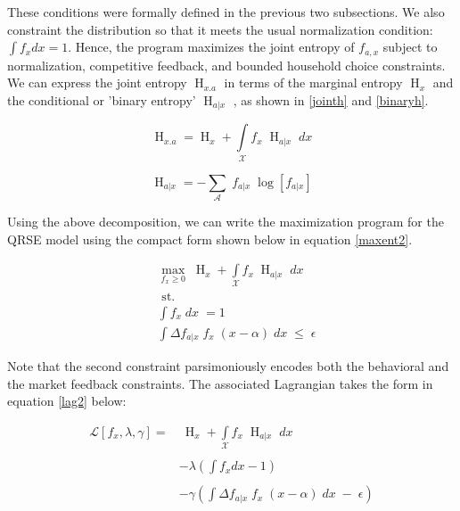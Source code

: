 \medskip

These conditions were formally defined in the previous two
subsections. We also constraint the distribution so that it meets the
usual normalization condition: $\int f_{x} dx=1$. Hence, the
program maximizes the joint entropy of $f_{a,x}$ subject to
normalization, competitive feedback, and bounded household
choice constraints. We can express the joint entropy $\operatorname{H}_{x.a}$
in terms of the marginal entropy $\operatorname{H}_{x}$ and the conditional or
'binary entropy'  $\operatorname{H}_{a|x}$  \citep{cover2006elements},
as shown in \ref{jointh} and \ref{binaryh}. 


\medskip


\begin{equation} \label{jointh}
\operatorname{H}_{x.a} = \operatorname{H}_{x}  + \int\limits_{\mathcal{X}}f_{x} \; \operatorname{H}_{a|x} \; dx
\end{equation}


\begin{equation} \label{binaryh}
\operatorname{H}_{a|x}= - \sum\limits_{\mathcal{A}}\; f_{a|x} \; \operatorname{log} [f_{a|x}]
\end{equation}

\medskip 


Using the above decomposition, we can write the
maximization program for the QRSE model using the compact form shown
below in equation \ref{maxent2}.

\medskip

\begin{equation} \label{maxent2}
\begin{aligned}
&\max_{f_{x} \geq 0} \; \operatorname{H}_{x}  + \int\limits_{\mathcal{X}}f_{x} \; \operatorname{H}_{a|x} \; dx\\ 
&\text { st. } \\ 
& \int f_{x} \; dx \; =1 \\
&\int \Delta f_{a|x} \; f_{x} \; (x-\alpha) \; dx \; \leq \; \epsilon
\end{aligned}
\end{equation}


\medskip


Note that the second constraint parsimoniously encodes both the
behavioral and the market feedback constraints. The associated
Lagrangian takes the form in equation \ref{lag2} below:

\medskip

\begin{equation} \label{lag2}
\begin{aligned}
\mathcal{L}[f_{x}, \lambda, \gamma]=& \:\operatorname{H}_{x}  + \int\limits_{\mathcal{X}}f_{x} \; \operatorname{H}_{a|x} \; dx \\
&\\
&-\lambda\left(\int f_{x} d x-1\right) \\
&\\
&-\gamma\left(\int \Delta f_{a|x} \; f_{x} \; (x-\alpha) \; dx \; - \; \epsilon\right)
\end{aligned}
\end{equation}



